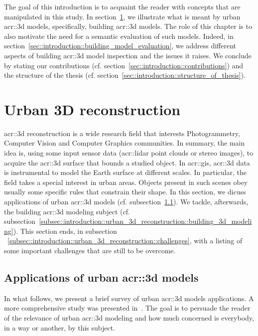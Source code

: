 \minitoc

\phantom{M}

The goal of this introduction is to acquaint the reader with concepts that are manipulated in this study.
In section~\ref{sec::introduction::urban_3d_reconstruction}, we illustrate what is meant by urban \gls{acr::3d} models, specifically,  building \gls{acr::3d} models.
The role of this chapter is to also motivate the need for a semantic evaluation of such models.
Indeed, in section~\ref{sec::introduction::building_model_evaluation}, we address different aspects of building \gls{acr::3d} model inspection and the issues it raises.
We conclude by stating our contributions (cf. section~\ref{sec::introduction::contributions}) and the structure of the thesis (cf. section~\ref{sec::introduction::structure_of_thesis}).

\section{Urban 3D reconstruction}
    \label{sec::introduction::urban_3d_reconstruction}
    \gls{acr::3d} reconstruction is a wide research field that interests Photogrammetry, Computer Vision and Computer Graphics communities.
    In summary, the main idea is, using some input sensor data (\gls{acr::lidar} point clouds or stereo images), to acquire the \gls{acr::3d} surface that bounds a studied object.
    In \gls{acr::gis}, \gls{acr::3d} data is instrumental to model the Earth surface at different scales.
    In particular, the field takes a special interest in urban areas.
    Objects present in such scenes obey usually some specific rules that constrain their shape.
    In this section, we dicuss applications of urban \gls{acr::3d} models (cf. subsection~\ref{subsec::introduction::urban_3d_reconstruction::applications}).
    We tackle, afterwards, the  building \gls{acr::3d} modeling subject (cf. subsection~\ref{subsec::introduction::urban_3d_reconstruction::building_3d_modeling}).
    This section ends, in subsection ~\ref{subsec::introduction::urban_3d_reconstruction::challenges}, with a listing of some important challenges that are still to be overcome.

    \subsection{Applications of urban \acrshort{acr::3d} models}
        \label{subsec::introduction::urban_3d_reconstruction::applications}
        In what follows, we present a brief survey of  urban \gls{acr::3d} models applications.
        A more comprehensive study was presented in~\cite{ijgi4042842}.
        The goal is to persuade the reader of the relevance of urban \gls{acr::3d} modeling and how much concerned is everybody, in a way or another, by this subject.
